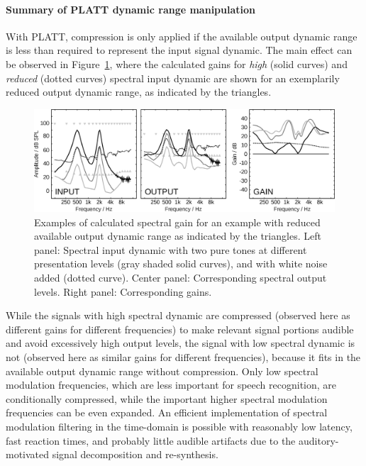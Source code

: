 \documentclass[10pt,a4paper,twocolumn]{article}
\begin{document}
\paragraph{Summary of PLATT dynamic range manipulation}
%
With PLATT, compression is only applied if the available output dynamic range is less than required to represent the input signal dynamic.
%
The main effect can be observed in Figure~\ref{fig:10}, where the calculated gains for \emph{high} (solid curves) and \emph{reduced} (dotted curves) spectral input dynamic are shown for an exemplarily reduced output dynamic range, as indicated by the triangles.
%
\begin{figure}
	\centerline{\includegraphics[width=.8\textwidth]{images/details-dynamic}}
	\caption{Examples of calculated spectral gain for an example with reduced available output dynamic range as indicated by the triangles.
	Left panel: Spectral input dynamic with two pure tones at different presentation levels (gray shaded solid curves), and with white noise added (dotted curve).
	Center panel: Corresponding spectral output levels.
	Right panel: Corresponding gains.}
	\label{fig:10}
\end{figure} 
%
While the signals with high spectral dynamic are compressed (observed here as different gains for different frequencies) to make relevant signal portions audible and avoid excessively high output levels, the signal with low spectral dynamic is not (observed here as similar gains for different frequencies), because it fits in the available output dynamic range without compression.
%
Only low spectral modulation frequencies, which are less important for speech recognition, are conditionally compressed, while the important higher spectral modulation frequencies can be even expanded.
%
An efficient implementation of spectral modulation filtering in the time-domain is possible with reasonably low latency, fast reaction times, and probably little audible artifacts due to the auditory-motivated signal decomposition and re-synthesis.
\end{document}

